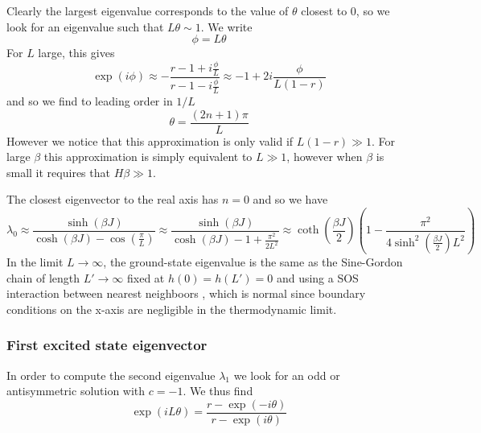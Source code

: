 Clearly the largest eigenvalue corresponds to the value of $\theta$ closest to $0$,  so we look for an eigenvalue such that $L \theta \sim 1$. We write
\begin{equation}
\phi = L \theta
\end{equation}
For $L$ large, this gives
\begin{equation}
\exp(i\phi) \approx -\frac{r-1+ i\frac{\phi}{L}}{ r-1- i\frac{\phi}{L}}\approx -1 +2 i\frac{\phi}{L(1-r)}
\end{equation}
and so we find to leading order in $1/L$
\begin{equation}
\theta = \frac{(2n+1)\pi}{L}
\end{equation}
However we notice that this approximation is only valid if $L(1-r) \gg1$. For large $\beta$ this approximation is simply equivalent to $L\gg1$, however when $\beta$ is small it requires
that $H \beta \gg 1$.

The closest eigenvector to the real axis has $n=0$ and so we have
\begin{equation}
\lambda_0 \approx \frac{\sinh(\beta J)}{\cosh(\beta J) - \cos(\frac{\pi}{L})} \approx \frac{\sinh(\beta J)}{\cosh(\beta J) - 1+ \frac{\pi^2}{2 L^2}} \approx \coth(\frac{\beta J}{2})(1 - \frac{\pi^2}{4\sinh^2(\frac{\beta J}{2}) L^2})
\label{ground-sos}
\end{equation}
In the limit $L\to \infty$, the ground-state eigenvalue is the same as the Sine-Gordon chain of length $L' \to \infty$ fixed at $h(0) = h(L') = 0$ and using a SOS interaction between nearest neighboors \cite{guyer_sine-gordon_1979}, which is normal since boundary conditions on the x-axis are negligible in the thermodynamic limit.

\subsubsection*{First excited state eigenvector}
In order to compute the second eigenvalue $\lambda_1$ we look for an odd or antisymmetric solution with $c=-1$. We thus find
\begin{equation}
\exp(i L\theta) = \frac{r-\exp(-i\theta)}{r-\exp(i\theta)}
\label{theta}
\end{equation}

